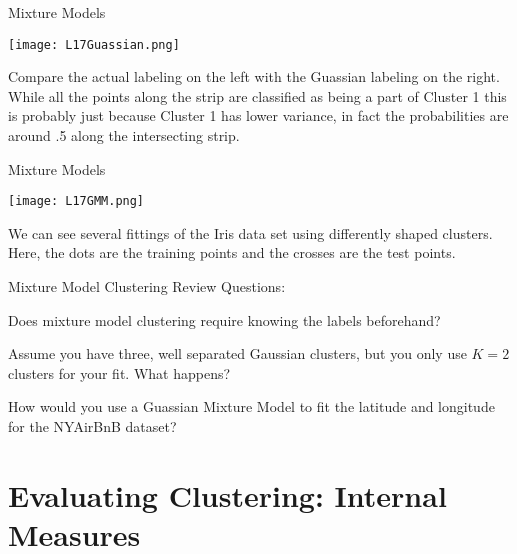 \documentclass[10pt, table, dvipsnames,xcdraw,handout]{beamer}
\begin{document}
\begin{frame}[fragile]{Mixture Models}
  \begin{minipage}[t][0.5\textheight][t]{\textwidth}
	\centering \texttt{[image: L17Guassian.png]}
  \end{minipage}
  \vfill
\begin{minipage}[t][0.5\textheight][t]{\textwidth}
Compare the actual labeling on the left with the Guassian labeling on the right. While all the points along the strip are classified as being a part of Cluster 1 this is probably just because Cluster 1 has lower variance, in fact the probabilities are around .5 along the intersecting strip. 
\end{minipage}
\end{frame}





\begin{frame}[fragile]{Mixture Models}
  \begin{minipage}[t][0.7\textheight][t]{\textwidth}
	\centering \texttt{[image: L17GMM.png]}
  \end{minipage}
  \vfill
\begin{minipage}[t][0.3\textheight][t]{\textwidth}
We can see several fittings of the Iris data set using differently shaped clusters. Here, the dots are the training points and the crosses are the test points. 
\end{minipage}
\end{frame}



\begin{frame}[fragile]{Mixture Model Clustering}
Review Questions:

Does mixture model clustering require knowing the labels beforehand?

Assume you have three, well separated Gaussian clusters, but you only use $K=2$ clusters for your fit. What happens? 

How would you use a Guassian Mixture Model to fit the latitude and longitude for the NYAirBnB dataset?
\end{frame}




\section{Evaluating Clustering: Internal Measures}
\end{document}
